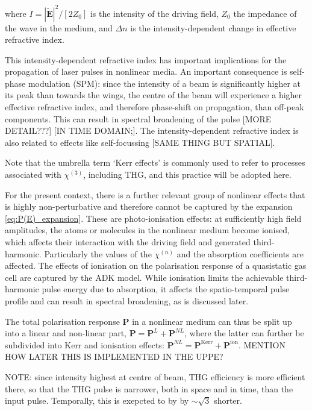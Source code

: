 \documentclass[a4paper]{jpconf}
\begin{document}
where $I = |\tilde{\mathbf{E}}|^2/[2Z_0]$ is the intensity of the driving field, $Z_0$ the impedance of the wave in the medium, and $\Delta n$ is the intensity-dependent change in effective refractive index. \par 
This intensity-dependent refractive index has important implications for the propagation of laser pulses in nonlinear media. An important consequence is self-phase modulation (SPM): since the intensity of a beam is significantly higher at its peak than towards the wings, the centre of the beam will experience a higher effective refractive index, and therefore phase-shift on propagation, than off-peak components. This can result in spectral broadening of the pulse [MORE DETAIL???] [IN TIME DOMAIN;]. The intensity-dependent refractive index is also related to effects like self-focussing [SAME THING BUT SPATIAL]. \par 
Note that the umbrella term `Kerr effects' is commonly used to refer to processes associated with $\chi^{(3)}$, including THG, and this practice will be adopted here. \par 
For the present context, there is a further relevant group of nonlinear effects that is highly non-perturbative and therefore cannot be captured by the expansion \eqref{eq:P(E)_expansion}. These are photo-ionisation effects: at sufficiently high field amplitudes, the atoms or molecules in the nonlinear medium become ionised, which affects their interaction with the driving field and generated third-harmonic. Particularly the values of the $\chi^{(n)}$ and the absorption coefficients are affected. The effects of ionisation on the polarisation response of a quasistatic gas cell are captured by the ADK model. While ionisation limits the achievable third-harmonic pulse energy due to absorption, it affects the spatio-temporal pulse profile and can result in spectral broadening, as is discussed later. \par 
The total polarisation response $\mathbf{P}$ in a nonlinear medium can thus be split up into a linear and non-linear part, $\mathbf{P} = \mathbf{P}^L + \mathbf{P}^{NL}$, where the latter can further be subdivided into Kerr and ionisation effects: $\mathbf{P}^{NL} = \mathbf{P}^{\text{Kerr}} + \mathbf{P}^{\text{ion}}.$ MENTION HOW LATER THIS IS IMPLEMENTED IN THE UPPE?



NOTE: since intensity highest at centre of beam, THG efficiency is more efficient there, so that the THG pulse is narrower, both in space and in time, than the input pulse. Temporally, this is exepcted to by by $\sim \sqrt{3}$ shorter. 
\end{document}
